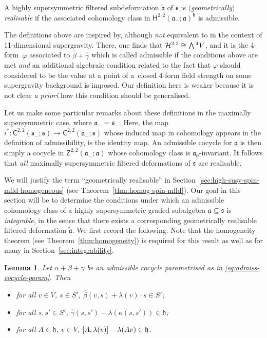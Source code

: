 \documentclass[11pt]{article}
\numberwithin{equation}{section}
\numberwithin{equation}{section}
\newtheorem{Lemma}[Theorem]{Lemma}
\newcommand{\fa}{\mathfrak{a}}
\newcommand{\fh}{\mathfrak{h}}
\newcommand{\fs}{\mathfrak{s}}
\newcommand{\cH}{\mathcal{H}}
\newcommand{\ssC}{\mathsf{C}}
\newcommand{\ssH}{\mathsf{H}}
\newcommand{\ssZ}{\mathsf{Z}}
\newcommand{\betahat}{\widehat{\beta}}
\newcommand{\gammahat}{\widehat{\gamma}}
\newcommand{\fatilde}{\widetilde{\fa}}
\newcommand{\Wedge}{\mathchoice{{\textstyle\bigwedge}}{\bigwedge}{\bigwedge}{\bigwedge}}	%
\newcommand{\1}{\mathbbm{1}}
\begin{document}
\begin{Definition}\label{def:geom-real}
	A highly supersymmetric filtered subdeformation $\fatilde$ of $\fs$ is \emph{$($geometrically$)$ realisable} if the associated cohomology class in $\ssH^{2,2}(\fa_-;\fa)^\fh$ is admissible.
\end{Definition}

The definitions above are inspired by, although \emph{not} equivalent to \cite[Definition~9]{Figueroa-OFarrill2017_1} in the context of 11-dimensional supergravity. There, one finds that $\cH^{2,2}\cong \Wedge^4V$, and it is the 4-form~$\varphi$ associated to $\betahat+\gammahat$ which is called admissible if the conditions above are met \emph{and} an additional algebraic condition related to the fact that $\varphi$ should considered to be the value at a point of a~closed 4-form field strength on some supergravity background is imposed. Our definition here is weaker because it is not clear \textit{a priori} how this condition should be generalised.

Let us make some particular remarks about these definitions in the maximally supersymmetric case, where $\fa_-=\fs_-$. Here, the map $i^*\colon\ssC^{2,2}(\fs_-;\fs)\to\ssC^{2,2}(\fa_-;\fs)$ whose induced map in cohomology appears in the definition of admissibility, is the identity map. An admissible cocycle for $\fa$ is then simply a cocycle in $\ssZ^{2,2}(\fa_-;\fa)$ whose cohomology class is $\fa_0$-invariant. It follows that \emph{all} maximally supersymmetric filtered deformations of $\fs$ are realisable.

We will justify the term ``geometrically realisable'' in Section~\ref{sec:high-susy-spin-mfld-homogeneous} (see Theorem~\ref{thm:homog-spin-mfld}). Our goal in this section will be to determine the conditions under which an admissible cohomology class of a highly supersymmetric graded subalgebra $\fa\subseteq\fs$ is \emph{integrable}, in the sense that there exists a corresponding geometrically realisable filtered deformation $\fatilde$. We first record the following. Note that the homogeneity theorem (see Theorem~\ref{thm:homogeneity}) is required for this result as well as for many in Section~\ref{sec:integrability}.

\begin{Lemma}\label{lemma:admiss-props}
	Let $\alpha+\beta+\gamma$ be an admissible cocycle parametrised as in \eqref{eq:admiss-cocycle-param}. Then
	\begin{itemize}\itemsep=0pt
		\item for all $v\in V$, $s\in S'$, $\betahat(v,s)+\lambda(v)\cdot s \in S'$;
		\item for all $s,s'\in S'$, $\gammahat(s,s')-\lambda(\kappa(s,s'))\in\fh$;
		\item for all $A\in\fh$, $v\in V$, $\comm{A}{\lambda(v)}-\lambda(Av)\in\fh$.
	\end{itemize}
\end{Lemma}
\end{document}

